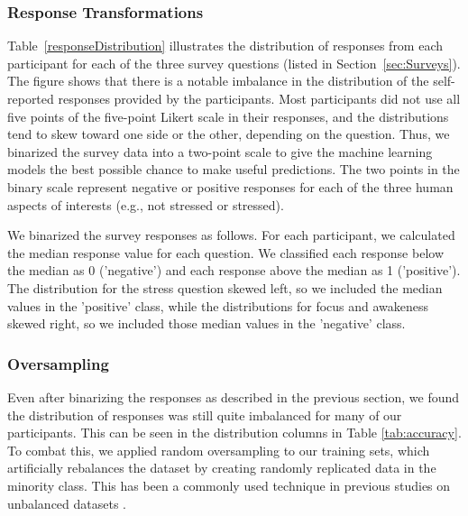 \subsubsection{Response Transformations}
Table~\ref{responseDistribution} illustrates the distribution of responses from each participant for each of the three survey questions (listed in Section~\ref{sec:Surveys}). The figure shows that there is a notable imbalance in the distribution of the self-reported responses provided by the participants. Most participants did not use all five points of the five-point Likert scale in their responses, and the distributions tend to skew toward one side or the other, depending on the question. Thus, we binarized the survey data into a two-point scale to give the machine learning models the best possible chance to make useful predictions. The two points in the binary scale represent negative or positive responses for each of the three human aspects of interests (e.g., not stressed or stressed). 

We binarized the survey responses as follows. For each participant, we calculated the median response value for each question. We classified each response below the median as 0 ('negative') and each response above the median as 1 ('positive'). The distribution for the stress question skewed left, so we included the median values in the 'positive' class, while the distributions for focus and awakeness skewed right, so we included those median values in the 'negative' class.

\subsubsection{Oversampling}
Even after binarizing the responses as described in the previous section, we found the distribution of responses was still quite imbalanced for many of our participants. This can be seen in the distribution columns in Table \ref{tab:accuracy}. To combat this, we applied random oversampling to our training sets, which artificially rebalances the dataset by creating randomly replicated data in the minority class. This has been a commonly used technique in previous studies on unbalanced datasets \cite{chawla2004,yap2014}.



